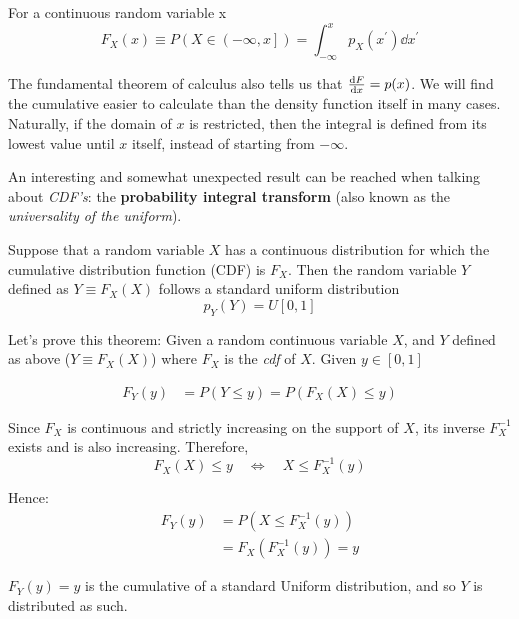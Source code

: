\begin{definition}
	For a continuous random variable x
	\[
	F_X(x)\equiv P\left(X\in \left(-\infty, x\right]\right) = \int_{-\infty}^{x}p_X(x^\prime)\dd x^\prime
	\]
\end{definition}

The fundamental theorem of calculus also tells us that $\frac{\mathrm{d} F}{\mathrm{d} x}=p(x)$. We will find the cumulative easier to calculate than the density function itself in many cases. Naturally, if the domain of $x$ is restricted, then the integral is defined from its lowest value until $x$ itself, instead of starting from $-\infty$.

An interesting and somewhat unexpected result can be reached when talking about \emph{CDF's}: the \textbf{probability integral transform} \cite{david1948probability} (also known as the \emph{universality of the uniform}).

\begin{theorem}
	Suppose that a random variable $X$ has a continuous distribution for which the cumulative distribution function (CDF) is $F_X$. Then the random variable $Y$ defined as $Y \equiv F_X(X)$ follows a standard uniform distribution
	\[
	p_Y(Y) = U[0,1]
	\]
\label{th:universal_uniform}
\end{theorem}

\begin{example}
Let's prove this theorem:
Given a random continuous variable $X$, and $Y$ defined as above ($Y \equiv F_X(X)$) where $F_X$ is the \emph{cdf} of $X$. Given $y\in[0,1]$

\begin{align*}
	F_Y(y) &= P\left(Y\leq y\right) = P\left(F_X(X)\leq y\right)
\end{align*}

Since $F_X$ is continuous and strictly increasing on the support of $X$, its inverse $F_X^{-1}$ exists and is also increasing. Therefore,
\[
F_X(X) \le y
\quad \Longleftrightarrow \quad
X \le F_X^{-1}(y)
\]

Hence:
\begin{align*}
	F_Y(y) &= P\left(X\leq F_X^{-1}(y)\right)\\
	&= F_X\left(F_X^{-1}(y)\right) = y
\end{align*}

$F_Y(y) = y$ is the cumulative of a standard Uniform distribution, and so $Y$ is distributed as such.
\end{example}

